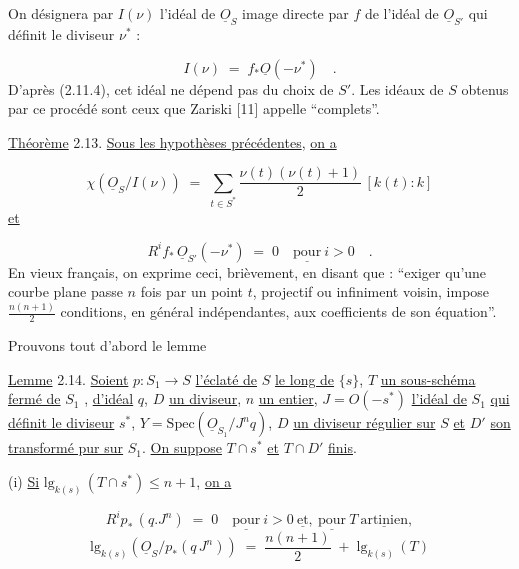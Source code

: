 On désignera par $I(\nu)$ l'idéal de $\underline{O}_S$ image directe par $f$ de l'idéal de $\underline{O}_{S'}$ qui définit le diviseur $\nu^*$ :

\begin{equation*}
I(\nu) \;=\; f_*\underline{O}(-\nu^*) \quad .
\end{equation*}
D'après (2.11.4), cet idéal ne dépend pas du choix de $S'$. Les idéaux de $S$ obtenus par ce procédé sont ceux que Zariski [11] appelle ``complets''.

\underline{Théorème} 2.13. \underline{Sous les hypothèses précédentes}, \underline{on a}

\begin{equation*}
\chi(\underline{O}_S/I(\nu)) \;=\; \sum_{t \in S^*} \frac{\nu(t)(\nu(t)+1)}{2}\,[k(t) : k]
\end{equation*}
\underline{et}

\begin{equation*}
R^i f_*\,\underline{O}_{S'}(-\nu^*) \;=\; 0 \quad \underline{\mathrm{pour}}\ i > 0 \quad .
\end{equation*}
En vieux français, on exprime ceci, brièvement, en disant que : ``exiger qu'une courbe plane passe $n$ fois par un point $t$, projectif ou infiniment voisin, impose $\frac{n(n+1)}{2}$ conditions, en général indépendantes, aux coefficients de son équation''.

Prouvons tout d'abord le lemme

\underline{Lemme} 2.14. \underline{Soient} $p : S_1 \longrightarrow S$ \underline{l'éclaté de} $S$ \underline{le long de} $\{s\}$, $T$ \underline{un sous-schéma fermé de} $S_1$ , \underline{d'idéal} $q$, $D$ \underline{un diviseur}, $n$ \underline{un entier}, $J = O(-s^*)$ \underline{l'idéal de} $S_1$ \underline{qui définit le diviseur} $s^*$, $Y = \mathrm{Spec}(\underline{O}_{S_1}/J^n q)$, $D$ \underline{un diviseur régulier sur} $S$ \underline{et} $D'$ \underline{son transformé pur sur} $S_1$. \underline{On suppose} $T \cap s^*$ \underline{et} $T \cap D'$ \underline{finis}.

(i) \underline{Si} $\mathrm{lg}_{k(s)}\,(T \cap s^*) \leq n +1$, \underline{on a}

\begin{equation*}
R^i p_*\,(q.J^n) \;=\; 0 \quad \underline{\mathrm{pour}}\ i > 0 \ \underline{\mathrm{et}},\ \underline{\mathrm{pour}}\ T\ \underline{\mathrm{artinien}},
\end{equation*}
\begin{equation*}
\mathrm{lg}_{k(s)}(\underline{O}_S/p_*(q\,J^n)) \;=\; \frac{n(n+1)}{2} \;+\; \mathrm{lg}_{k(s)}\,(T)
\end{equation*}

